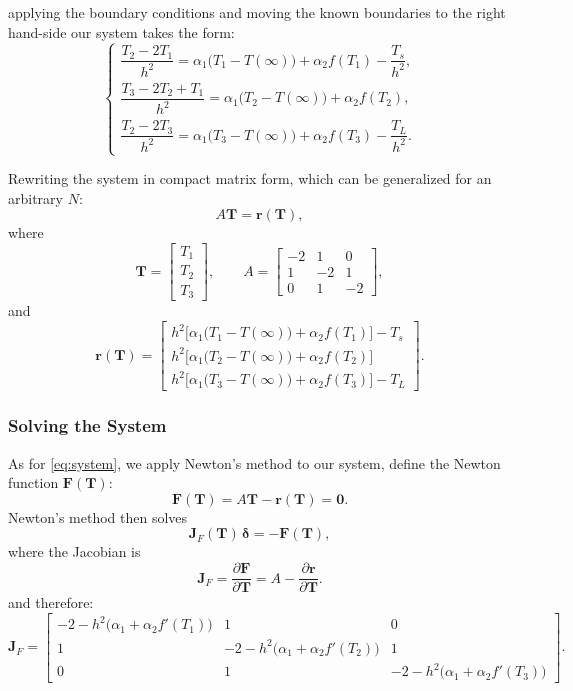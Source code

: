 \documentclass[11pt, a4paper]{article}
\theoremstyle{definition}
\begin{document}
applying the boundary conditions and moving the known boundaries to the right hand-side our system takes the form:
\[
\begin{cases}
\dfrac{T_2 - 2T_1}{h^2}
=
\alpha_1\big(T_1 - T(\infty)\big) + \alpha_2 f(T_1) - \dfrac{T_s}{h^2}, \\[6pt]
\dfrac{T_3 - 2T_2 + T_1}{h^2}
=
\alpha_1\big(T_2 - T(\infty)\big) + \alpha_2 f(T_2), \\[6pt]
\dfrac{T_2 - 2T_3}{h^2}
=
\alpha_1\big(T_3 - T(\infty)\big) + \alpha_2 f(T_3) - \dfrac{T_L}{h^2}.
\end{cases}
\]

Rewriting the system in compact matrix form, which can be generalized for an arbitrary $N$:
$$
A\mathbf{T} = \mathbf{r}(\mathbf{T}),
$$
where
$$
\mathbf{T} =
\begin{bmatrix}
T_1 \\[4pt]
T_2 \\[4pt]
T_3
\end{bmatrix},
\qquad
A =
\begin{bmatrix}
-2 & 1 & 0 \\[4pt]
1 & -2 & 1 \\[4pt]
0 & 1 & -2
\end{bmatrix},
$$
and
$$
\mathbf{r}(\mathbf{T}) =
\begin{bmatrix}
h^2\big[\alpha_1\big(T_1 - T(\infty)\big) + \alpha_2 f(T_1)\big] - T_s \\[6pt]
h^2\big[\alpha_1\big(T_2 - T(\infty)\big) + \alpha_2 f(T_2)\big] \\[6pt]
h^2\big[\alpha_1\big(T_3 - T(\infty)\big) + \alpha_2 f(T_3)\big] - T_L
\end{bmatrix}.
$$
\subsubsection{Solving the System}
\label{solving-the-system}
As for \cref{eq:system}, we apply Newton's method to our system, define the Newton function $\mathbf{F}(\mathbf{T})$:
$$
\mathbf{F}(\mathbf{T}) = A\mathbf{T} - \mathbf{r}(\mathbf{T}) = \mathbf{0}.
$$
Newton's method then solves
$$
\mathbf{J}_F(\mathbf{T})\,\boldsymbol{\delta} = -\mathbf{F}(\mathbf{T}),
$$
where the Jacobian is
$$
\mathbf{J}_F = \frac{\partial \mathbf{F}}{\partial \mathbf{T}} = A - \frac{\partial \mathbf{r}}{\partial \mathbf{T}}.
$$
and therefore:
$$
\mathbf{J}_F =
\begin{bmatrix}
-2 - h^2\big(\alpha_1 + \alpha_2 f'(T_1)\big) & 1 & 0 \\[6pt]
1 & -2 - h^2\big(\alpha_1 + \alpha_2 f'(T_2)\big) & 1 \\[6pt]
0 & 1 & -2 - h^2\big(\alpha_1 + \alpha_2 f'(T_3)\big)
\end{bmatrix}.
$$
\end{document}
